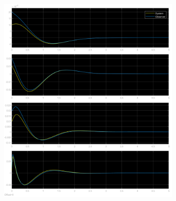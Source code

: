\documentclass[class=article, crop=false]{standalone}
\begin{document}
\begin{resolution}
\begin{figure}[H]
\begin{subfigure}[b]{0.475\textwidth}
            \caption{}
        \end{subfigure}
        \begin{subfigure}[b]{0.475\textwidth}
            \centering
            \includegraphics[width=\textwidth]{../images/simulink_scope5_0_01_02.png}
            \caption{}
        \end{subfigure}
        \caption{}
    \end{figure}
\end{resolution}

\newpage
\end{document}
